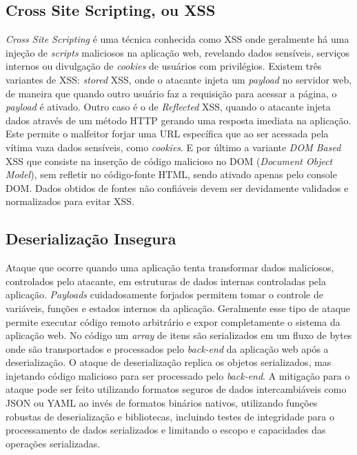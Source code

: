 \subsection{Cross Site Scripting, ou XSS}
\textit{Cross Site Scripting} é uma técnica conhecida como XSS onde geralmente há uma injeção de \textit{scripts} maliciosos na aplicação web, revelando dados sensíveis, serviços internos ou divulgação de \textit{cookies} de usuários com privilégios.
Existem três variantes de XSS: \textit{stored} XSS, onde o atacante injeta um \textit{payload} no servidor web, de maneira que quando outro usuário faz a requisição para acessar a página, o \textit{payload} é ativado. Outro caso é o de \textit{Reflected} XSS, quando o atacante injeta dados através de um método HTTP gerando uma resposta imediata na aplicação. Este permite o malfeitor forjar uma URL específica que ao ser acessada pela vítima vaza dados sensíveis, como \textit{cookies}. E por último a variante \textit{DOM Based} XSS que consiste na inserção de código malicioso no DOM (\textit{Document Object Model}), sem refletir no código-fonte HTML, sendo ativado apenas pelo console DOM.
Dados obtidos de fontes não confiáveis devem ser devidamente validados e normalizados para evitar XSS.

\subsection{Deserialização Insegura}
Ataque que ocorre quando uma aplicação tenta transformar dados maliciosos, controlados pelo atacante, em estruturas de dados internas controladas pela aplicação. \textit{Payloads} cuidadosamente forjados permitem tomar o controle de variáveis, funções e estados internos da aplicação. Geralmente esse tipo de ataque permite executar código remoto arbitrário e expor completamente o sistema da aplicação web.
No código um \textit{array} de itens são serializados em um fluxo de bytes onde são transportados e processados pelo \textit{back-end} da aplicação web após a deserialização.
O ataque de deserialização replica os objetos serializados, mas injetando código malicioso para ser processado pelo \textit{back-end}.
A mitigação para o ataque pode ser feito utilizando formatos seguros de dados intercambiáveis como JSON ou YAML ao invés de formatos binários nativos, utilizando funções robustas de deserialização e bibliotecas, incluindo testes de integridade para o processamento de dados serializados e limitando o escopo e capacidades das operações serializadas.

